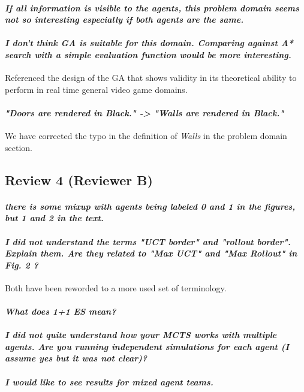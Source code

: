 \documentclass{article}
\begin{document}
\paragraph*{\textit{If all information is visible to the agents,
this problem domain seems not so interesting especially if
both agents are the same.}}
\paragraph*{\textit{I don't think GA is suitable for this domain.
Comparing against A* search with a simple evaluation function would be more interesting.}}
Referenced the design of the GA that shows validity in its theoretical ability to perform in real time general video game domains.

\paragraph*{\textit{"Doors are rendered in Black." -> "Walls are rendered in Black."}}
We have corrected the typo in the definition of \emph{Walls} in the problem domain section.
\subsection{Review 4 (Reviewer B)}
\paragraph*{\textit{there is some mixup with agents being labeled 0 and 1 in the figures, but 1 and 2 in the text.}}

\paragraph*{\textit{I did not understand the terms "UCT border" and "rollout border". Explain them. Are they related to "Max UCT" and "Max Rollout" in Fig. 2 ?}}
Both have been reworded to a more used set of terminology.
\paragraph*{\textit{What does 1+1 ES mean?}}
\paragraph*{\textit{I did not quite understand how your MCTS works with multiple agents. Are you running independent simulations for each agent (I assume yes but it was not clear)? }}
\paragraph*{\textit{I would like to see results for mixed agent teams.}}
\end{document}
